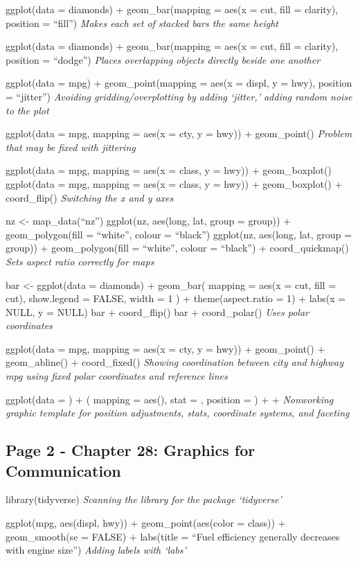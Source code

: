 \documentclass[
]{article}
\begin{document}
ggplot(data = diamonds) + geom\_bar(mapping = aes(x = cut, fill =
clarity), position = ``fill'') \emph{Makes each set of stacked bars the
same height}

ggplot(data = diamonds) + geom\_bar(mapping = aes(x = cut, fill =
clarity), position = ``dodge'') \emph{Places overlapping objects
directly beside one another}

ggplot(data = mpg) + geom\_point(mapping = aes(x = displ, y = hwy),
position = ``jitter'') \emph{Avoiding gridding/overplotting by adding
`jitter,' adding random noise to the plot}

ggplot(data = mpg, mapping = aes(x = cty, y = hwy)) + geom\_point()
\emph{Problem that may be fixed with jittering}

ggplot(data = mpg, mapping = aes(x = class, y = hwy)) + geom\_boxplot()
ggplot(data = mpg, mapping = aes(x = class, y = hwy)) + geom\_boxplot()
+ coord\_flip() \emph{Switching the x and y axes}

nz \textless- map\_data(``nz'') ggplot(nz, aes(long, lat, group =
group)) + geom\_polygon(fill = ``white'', colour = ``black'') ggplot(nz,
aes(long, lat, group = group)) + geom\_polygon(fill = ``white'', colour
= ``black'') + coord\_quickmap() \emph{Sets aspect ratio correctly for
maps}

bar \textless- ggplot(data = diamonds) + geom\_bar( mapping = aes(x =
cut, fill = cut), show.legend = FALSE, width = 1 ) + theme(aspect.ratio
= 1) + labs(x = NULL, y = NULL) bar + coord\_flip() bar + coord\_polar()
\emph{Uses polar coordinates}

ggplot(data = mpg, mapping = aes(x = cty, y = hwy)) + geom\_point() +
geom\_abline() + coord\_fixed() \emph{Showing coordination between city
and highway mpg using fixed polar coordinates and reference lines}

ggplot(data = ) + ( mapping = aes(), stat = , position = ) + +
\emph{Nonworking graphic template for position adjustments, stats,
coordinate systems, and faceting}

\hypertarget{page-2---chapter-28-graphics-for-communication}{%
\subsection{Page 2 - Chapter 28: Graphics for
Communication}\label{page-2---chapter-28-graphics-for-communication}}

library(tidyverse) \emph{Scanning the library for the package
`tidyverse'}

ggplot(mpg, aes(displ, hwy)) + geom\_point(aes(color = class)) +
geom\_smooth(se = FALSE) + labs(title = ``Fuel efficiency generally
decreases with engine size'') \emph{Adding labels with `labs'}
\end{document}
